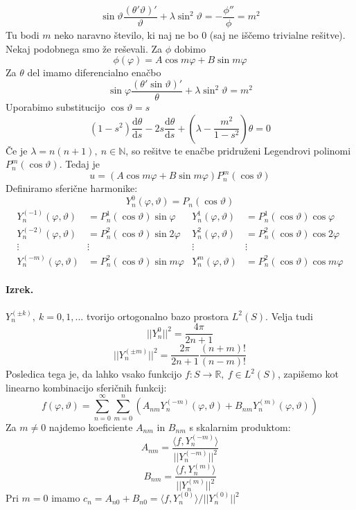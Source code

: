 \documentclass[a4paper]{article}
\newcommand{\dd}[2]{\frac{\mathrm{d} {#1}}{\mathrm{d} {#2}}}
\newcommand{\R}{\mathbb{R}}
\newcommand{\N}{\mathbb{N}}
\newcommand{\fn}[3]{{#1}\colon {#2} \rightarrow {#3}}
\newcommand{\avg}[1]{\langle {#1} \rangle}
\newcommand{\Sum}[2][0]{\sum_{{#2} = {#1}}^{\infty}}
\begin{document}
\[\sin\vartheta\frac{(\theta'\vartheta)'}{\vartheta} + \lambda\sin^2\vartheta = -\frac{\phi''}{\phi} = m^2\]
Tu bodi \(m\) neko naravno število, ki naj ne bo 0 (saj ne iščemo trivialne rešitve). \\[3mm]
Nekaj podobnega smo že reševali. Za \(\phi\) dobimo \[\phi(\varphi) = A\cos m\varphi + B\sin m\varphi\]
Za \(\theta\) del imamo diferencialno enačbo \[\sin\varphi \frac{(\theta'\sin\vartheta)'}{\theta} + \lambda\sin^2\vartheta = m^2\]
Uporabimo substitucijo \(\cos\vartheta = s\)
\[(1-s^2)\dd{\theta}{s} -2s\dd{\theta}{s} + \left(\lambda - \frac{m^2}{1-s^2}\right)\theta = 0\]
Če je \(\lambda = n(n+1),~n\in\N\), so rešitve te enačbe pridruženi Legendrovi polinomi \(P^m_n(\cos\vartheta)\). Tedaj je
\[u = (A\cos m\varphi + B\sin m\varphi)P^m_n(\cos\vartheta)\]
Definiramo sferične harmonike:
\[Y_n^0(\varphi, \vartheta) = P_n(\cos\vartheta)\]
\begin{align*}
    Y_n^{(-1)} (\varphi, \vartheta) & = P_n^1(\cos\vartheta)\sin\varphi & Y_n^1(\varphi, \vartheta) & = P_n^1(\cos\vartheta)\cos\varphi \\
    Y_n^{(-2)} (\varphi, \vartheta) & = P_n^2(\cos\vartheta)\sin2\varphi & Y_n^2(\varphi, \vartheta) & = P_n^2(\cos\vartheta)\cos2\varphi \\
    \vdots & \vdots & \vdots & \vdots \\
    Y_n^{(-m)} (\varphi, \vartheta) & = P_n^2(\cos\vartheta)\sin m\varphi & Y_n^m(\varphi, \vartheta) & = P_n^2(\cos\vartheta)\cos m\varphi
\end{align*}
\paragraph{Izrek.} \(Y_n^{(\pm k)},~k=0, 1, ...\) tvorijo ortogonalno bazo prostora \(L^2(S)\). Velja tudi \[||Y_{n}^{0}||^2 = \frac{4\pi}{2n+1}\]
\[||Y_n^{(\pm m)}||^2 = \frac{2\pi}{2n+1}\frac{(n+m)!}{(n-m)!}\]
Posledica tega je, da lahko vsako funkcijo \(\fn{f}{S}{\R},~f\in L^2(S)\), zapišemo kot linearno kombinacijo sferičnih funkcij:
\[f(\varphi, \vartheta) = \Sum{n}\sum_{m=0}^{n}\left(A_{nm}Y_n^{(-m)}(\varphi, \vartheta) + B_{nm}Y_n^{(m)}(\varphi, \vartheta)\right)\]
Za \(m \neq 0\) najdemo koeficiente \(A_{nm}\) in \(B_{nm}\) s skalarnim produktom:
\[A_{nm} = \frac{\avg{f, Y_n^{(-m)}}}{||Y_n^{(-m)}||^2}\]
\[B_{nm} = \frac{\avg{f, Y_n^{(m)}}}{||Y_n^{(m)}||^2}\]
Pri \(m=0\) imamo \(c_n = A_{n0} + B_{n0} = \avg{f, Y_{n}^{(0)}} / ||Y_{n}^{(0)}||^2\)
\end{document}

